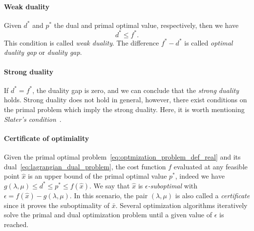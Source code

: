 \paragraph{Weak duality}
Given $d^*$ and $p^*$ the dual and primal optimal value, respectively, then we have
\begin{equation}
    d^* \le f^*.
\end{equation}
This condition is called \emph{weak duality}. The difference $f^* - d^*$ is called \emph{optimal duality gap} or \emph{duality gap}.

\paragraph{Strong duality}
If $d^* = f^*$, the duality gap is zero, and we can conclude that the \emph{strong duality} holds.
Strong duality does not hold in general, however, there exist conditions on the primal problem which imply the strong duality. Here, it is worth mentioning \emph{Slater's condition}~\citep[Chapter 5.2.7]{Boyd2004ConvexOptimization}.
\paragraph{Certificate of optimiality}
Given the primal optimal problem~\eqref{eq:optmization_problem_def_real} and its dual~\eqref{eq:lagrangian_dual_problem}, the cost function $f$ evaluated at any feasible point $\hat{x}$ is an upper bound of the primal optimal value $p^*$, indeed we have $g(\lambda,\mu) \le d^* \le p^* \le f(\hat{x})$. We say that $\hat{x}$ is $\epsilon$\emph{-suboptimal} with $\epsilon = f(\hat{x}) - g(\lambda,\mu)$. In this scenario, the pair $(\lambda, \mu)$ is also called a \emph{certificate} since it proves the suboptimality of $\bar{x}$. Several optimization algorithms iteratively solve the primal and dual optimization problem until a given value of $\epsilon$ is reached.

